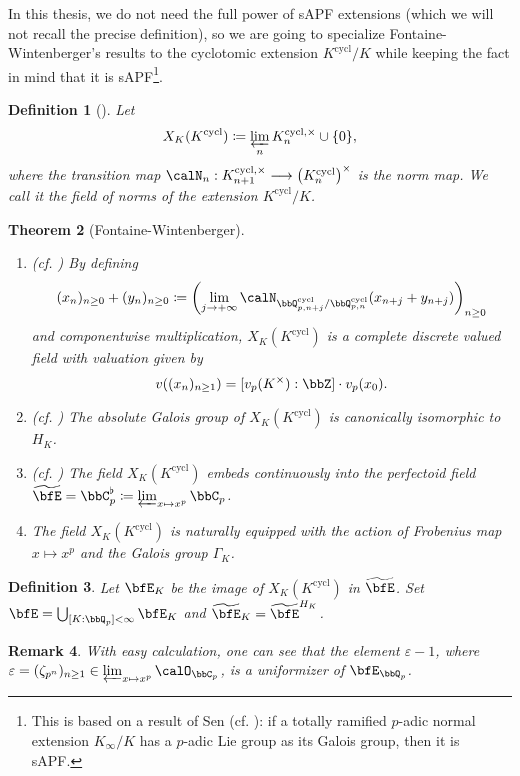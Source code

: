 \documentclass[a4paper,oneside]{amsart}
\DeclareMathOperator{\cycl}{cycl}
\newcommand{\lto}{\longrightarrow}
\newtheorem{theorem}{Theorem}[section]
\newtheorem{remark}[theorem]{Remark}
\newtheorem{definition}[theorem]{Definition}
\numberwithin{equation}{section}
\begin{document}
In this thesis, we do not need the full power of sAPF extensions (which we will not recall the precise definition), so we are going to specialize Fontaine-Wintenberger's results to the cyclotomic extension $K^{\cycl}/K$ while keeping the fact in mind that it is sAPF\footnote{This is based on a result of Sen (cf. \cite{sen_ramification_1972}): if a totally ramified $p$-adic normal extension $K_\infty/K$ has a $p$-adic Lie group as its Galois group, then it is sAPF.}.
\begin{definition}[{\cite[Section 2.1.1]{wintenberger_corps_1983}}]
    Let $$X_K(K^{\cycl})\coloneqq\varprojlim_n K_n^{\cycl,\times}\cup\{0\},$$
    where the transition map $\calN_n:K_{n+1}^{\cycl,\times}\lto \left(K_n^{\cycl}\right)^\times$ is the norm map. We call it the field of norms of the extension $K^{\cycl}/K$.
\end{definition}
\begin{theorem}[Fontaine-Wintenberger]\leavevmode
    \begin{enumerate}
        \item (cf. \cite[Th\'eor\`eme 2.1.3]{wintenberger_corps_1983}) By defining
              $$(x_n)_{n\geq 0}+(y_n)_{n\geq 0}\coloneqq \left(\lim_{j\to +\infty}\calN_{\bbQ_{p,n+j}^{\cycl}/\bbQ_{p,n}^{\cycl}}(x_{n+j}+y_{n+j})\right)_{n\geq 0}$$
              and componentwise multiplication, $X_K(K^{\cycl})$ is a complete discrete valued field with valuation given by
              $$v((x_n)_{n\geq 1})=[v_p(K^\times):\bbZ]\cdot v_p(x_0).$$
        \item (cf. \cite[Corollaire 3.2.3]{wintenberger_corps_1983}) The absolute Galois group of $X_K(K^{\cycl})$ is canonically isomorphic to $H_K$.
        \item (cf. \cite[Proposition 4.2.1]{wintenberger_corps_1983}) The field $X_K(K^{\cycl})$ embeds continuously into the perfectoid field $\widetilde{\bfE}=\bbC_p^\flat\coloneqq \varprojlim_{x\mapsto x^p}\bbC_p$.
        \item The field $X_K(K^{\cycl})$ is naturally equipped with the action of Frobenius map $x\mapsto x^p$ and the Galois group $\Gamma_K$.
    \end{enumerate}
\end{theorem}
\begin{definition}
    Let $\bfE_K$ be the image of $X_K(K^{\cycl})$ in $\widetilde{\bfE}$. Set $\bfE=\bigcup_{[K:\bbQ_p]<\infty}\bfE_K$ and $\widetilde{\bfE}_K=\widetilde{\bfE}^{H_K}$.
\end{definition}
\begin{remark}
    With easy calculation, one can see that the element $\varepsilon-1$, where $\varepsilon=(\zeta_{p^n})_{n\geq 1}\in \varprojlim_{x\mapsto x^p}\calO_{\bbC_p}$, is a uniformizer of $\bfE_{\bbQ_p}$.
\end{remark}
\end{document}
